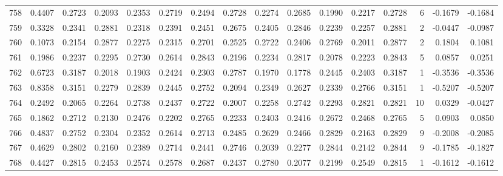 \begin{tabular}{lrrrrrrrrrrrrrrr}
758 &      0.4407 &  0.2723 &  0.2093 &  0.2353 &  0.2719 &  0.2494 &  0.2728 &  0.2274 &  0.2685 &  0.1990 &   0.2217 &     0.2728 &      6 &                   -0.1679 &                    -0.1684 \\
759 &      0.3328 &  0.2341 &  0.2881 &  0.2318 &  0.2391 &  0.2451 &  0.2675 &  0.2405 &  0.2846 &  0.2239 &   0.2257 &     0.2881 &      2 &                   -0.0447 &                    -0.0987 \\
760 &      0.1073 &  0.2154 &  0.2877 &  0.2275 &  0.2315 &  0.2701 &  0.2525 &  0.2722 &  0.2406 &  0.2769 &   0.2011 &     0.2877 &      2 &                    0.1804 &                     0.1081 \\
761 &      0.1986 &  0.2237 &  0.2295 &  0.2730 &  0.2614 &  0.2843 &  0.2196 &  0.2234 &  0.2817 &  0.2078 &   0.2223 &     0.2843 &      5 &                    0.0857 &                     0.0251 \\
762 &      0.6723 &  0.3187 &  0.2018 &  0.1903 &  0.2424 &  0.2303 &  0.2787 &  0.1970 &  0.1778 &  0.2445 &   0.2403 &     0.3187 &      1 &                   -0.3536 &                    -0.3536 \\
763 &      0.8358 &  0.3151 &  0.2279 &  0.2839 &  0.2445 &  0.2752 &  0.2094 &  0.2349 &  0.2627 &  0.2339 &   0.2766 &     0.3151 &      1 &                   -0.5207 &                    -0.5207 \\
764 &      0.2492 &  0.2065 &  0.2264 &  0.2738 &  0.2437 &  0.2722 &  0.2007 &  0.2258 &  0.2742 &  0.2293 &   0.2821 &     0.2821 &     10 &                    0.0329 &                    -0.0427 \\
765 &      0.1862 &  0.2712 &  0.2130 &  0.2476 &  0.2202 &  0.2765 &  0.2233 &  0.2403 &  0.2416 &  0.2672 &   0.2468 &     0.2765 &      5 &                    0.0903 &                     0.0850 \\
766 &      0.4837 &  0.2752 &  0.2304 &  0.2352 &  0.2614 &  0.2713 &  0.2485 &  0.2629 &  0.2466 &  0.2829 &   0.2163 &     0.2829 &      9 &                   -0.2008 &                    -0.2085 \\
767 &      0.4629 &  0.2802 &  0.2160 &  0.2389 &  0.2714 &  0.2441 &  0.2746 &  0.2039 &  0.2277 &  0.2844 &   0.2142 &     0.2844 &      9 &                   -0.1785 &                    -0.1827 \\
768 &      0.4427 &  0.2815 &  0.2453 &  0.2574 &  0.2578 &  0.2687 &  0.2437 &  0.2780 &  0.2077 &  0.2199 &   0.2549 &     0.2815 &      1 &                   -0.1612 &                    -0.1612 \\

\end{tabular}
